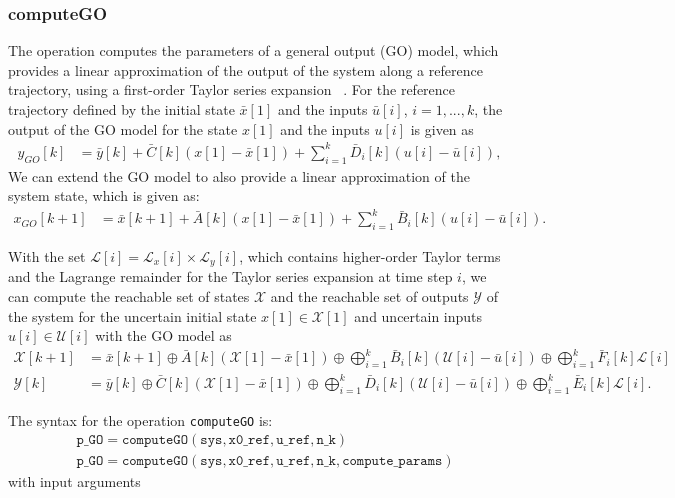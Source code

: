 \subsubsection{computeGO} \label{sec:computeGO}

The operation  computes the parameters of a general output (GO) model, which provides a linear approximation of the output of the system along a reference trajectory, using a first-order Taylor series expansion ~\cite{Luetzow2024b}. 
For the reference trajectory defined by the initial state $\bar{x}[1]$ and the inputs $\bar{u}[i]$, $i=1,...,k$, the output of the GO model for the state ${x}[1]$ and the inputs ${u}[i]$ is given as
\begin{align}
	y_{GO}[k] &= \bar{y}[k] + \bar{C}[k] (x[1]-\bar{x}[1]) + \sum_{i=1}^k \bar{D}_i[k] (u[i]-\bar{u}[i]) %
	, \label{eq:GOmodel_y}
\end{align} 
We can extend the GO model to also provide a linear approximation of the system state, which is given as:
\begin{align}	
	x_{GO}[k+1] &= \bar{x}[k+1] + \bar{A}[k] (x[1]-\bar{x}[1]) + \sum_{i=1}^k \bar{B}_i[k] (u[i]-\bar{u}[i]). %
	\label{eq:GOmodel_x} 
\end{align}

With the set $\mathcal{L}[i]=\mathcal{L}_x[i] \times \mathcal{L}_y[i]$, which contains higher-order Taylor terms and the Lagrange remainder for the Taylor series expansion at time step $i$, we can compute the reachable set of states $\mathcal{X}$ and the reachable set of outputs $\mathcal{Y}$ of the system for the uncertain initial state $x[1] \in \mathcal{X}[1]$ and uncertain inputs $u[i] \in \mathcal{U}[i]$ with the GO model as
\begin{align}
	\mathcal{X}[k+1] &= \bar{x}[k+1] \oplus \bar{A}[k] (\mathcal{X}[1]-\bar{x}[1]) \oplus \bigoplus_{i=1}^k \bar{B}_i[k] (\mathcal{U}[i]-\bar{u}[i]) \oplus \bigoplus_{i=1}^k \bar{F}_i[k] \mathcal{L}[i] \label{eq:GOmodel_xL} \\
	\mathcal{Y}[k] &= \bar{y}[k] \oplus \bar{C}[k] (\mathcal{X}[1]-\bar{x}[1]) \oplus \bigoplus_{i=1}^k \bar{D}_i[k] (\mathcal{U}[i]-\bar{u}[i]) \oplus \bigoplus_{i=1}^k \bar{E}_i[k] \mathcal{L}[i]. \label{eq:GOmodel_yL}
\end{align} 

The syntax for the operation \texttt{computeGO} is:
\begin{equation*}
\begin{split}
    & \texttt{p\_GO} = \texttt{computeGO}(\texttt{sys},\texttt{x0\_ref},\texttt{u\_ref},\texttt{n\_k}) \\
    & \texttt{p\_GO} = \texttt{computeGO}(\texttt{sys},\texttt{x0\_ref},\texttt{u\_ref},\texttt{n\_k},\texttt{compute\_params}) 
\end{split}
\end{equation*}
with input arguments

